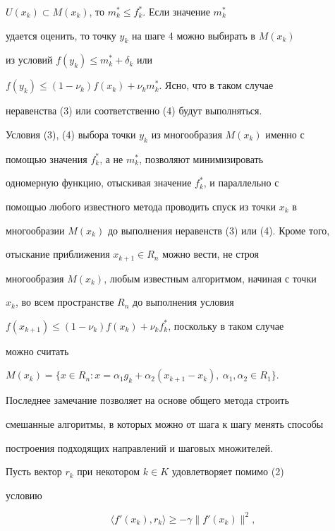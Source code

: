 $U(x_k)\subset M(x_k)$, то $m^*_k\leq f^*_k$. Если значение $m^*_k$


удается оценить, то точку $y_k$ на шаге 4 можно выбирать в $M(x_k)$


из условий $f(y_k)\leq m^*_k+\delta_k$ или 


$f(y_k)\leq (1-\nu_k)f(x_k)+\nu_km^*_k$. Ясно, что в таком случае 


неравенства (3) или соответственно (4) будут выполняться.





Условия (3), (4) выбора точки $y_k$ из многообразия $M(x_k)$ именно с


помощью значения $f^*_k$, а не $m^*_k$, позволяют минимизировать


одномерную функцию, отыскивая значение $f^*_k$, и параллельно с 


помощью любого известного метода проводить спуск из точки $x_k$ в


многообразии $M(x_k)$ до выполнения неравенств (3) или (4). Кроме того,


отыскание приближения $x_{k+1}\in R_n$ можно вести, не строя 


многообразия $M(x_k)$, любым известным алгоритмом, начиная с точки


$x_k$, во всем пространстве $R_n$ до выполнения условия


$f(x_{k+1})\leq (1-\nu_k)f(x_k)+\nu_k f^*_k$, поскольку в таком случае


можно считать


$M(x_k)=\{x\in R_n:x=\alpha_1g_k+\alpha_2(x_{k+1}-x_k),\


\alpha_1,\alpha_2\in R_1\}$. 


Последнее замечание позволяет на основе общего метода строить 


смешанные алгоритмы, в которых можно от шага к шагу менять способы


построения подходящих направлений и шаговых множителей.





Пусть вектор $r_k$ при некотором $k\in K$ удовлетворяет помимо (2)


условию


\begin{equation}


\langle f'(x_k),r_k\rangle\ge -\gamma \|f'(x_k)\|^2,


\end{equation}


